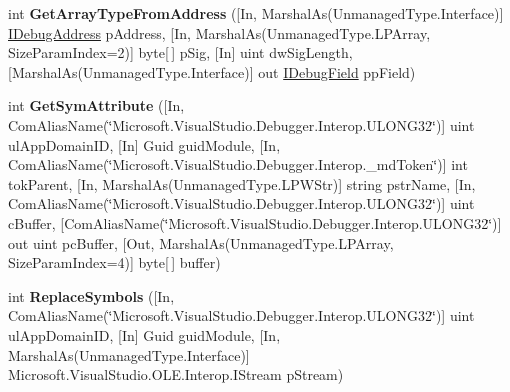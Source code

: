 \begin{DoxyCompactItemize}
\item 
\hypertarget{interface_microsoft_1_1_visual_studio_1_1_debugger_1_1_interop_e_e_1_1_i_debug_com_plus_symbol_provider_aad909dce4c228d835d3479d449cdf4b6}{int {\bfseries Get\+Array\+Type\+From\+Address} (\mbox{[}In, Marshal\+As(Unmanaged\+Type.\+Interface)\mbox{]} \hyperlink{interface_microsoft_1_1_visual_studio_1_1_debugger_1_1_interop_e_e_1_1_i_debug_address}{I\+Debug\+Address} p\+Address, \mbox{[}In, Marshal\+As(Unmanaged\+Type.\+L\+P\+Array, Size\+Param\+Index=2)\mbox{]} byte\mbox{[}$\,$\mbox{]} p\+Sig, \mbox{[}In\mbox{]} uint dw\+Sig\+Length, \mbox{[}Marshal\+As(Unmanaged\+Type.\+Interface)\mbox{]} out \hyperlink{interface_microsoft_1_1_visual_studio_1_1_debugger_1_1_interop_e_e_1_1_i_debug_field}{I\+Debug\+Field} pp\+Field)}\label{interface_microsoft_1_1_visual_studio_1_1_debugger_1_1_interop_e_e_1_1_i_debug_com_plus_symbol_provider_aad909dce4c228d835d3479d449cdf4b6}

\item 
\hypertarget{interface_microsoft_1_1_visual_studio_1_1_debugger_1_1_interop_e_e_1_1_i_debug_com_plus_symbol_provider_a0e70eb2419ce110831336adb5503863b}{int {\bfseries Get\+Sym\+Attribute} (\mbox{[}In, Com\+Alias\+Name(\char`\"{}Microsoft.\+Visual\+Studio.\+Debugger.\+Interop.\+U\+L\+O\+N\+G32\char`\"{})\mbox{]} uint ul\+App\+Domain\+I\+D, \mbox{[}In\mbox{]} Guid guid\+Module, \mbox{[}In, Com\+Alias\+Name(\char`\"{}Microsoft.\+Visual\+Studio.\+Debugger.\+Interop.\+\_\+md\+Token\char`\"{})\mbox{]} int tok\+Parent, \mbox{[}In, Marshal\+As(Unmanaged\+Type.\+L\+P\+W\+Str)\mbox{]} string pstr\+Name, \mbox{[}In, Com\+Alias\+Name(\char`\"{}Microsoft.\+Visual\+Studio.\+Debugger.\+Interop.\+U\+L\+O\+N\+G32\char`\"{})\mbox{]} uint c\+Buffer, \mbox{[}Com\+Alias\+Name(\char`\"{}Microsoft.\+Visual\+Studio.\+Debugger.\+Interop.\+U\+L\+O\+N\+G32\char`\"{})\mbox{]} out uint pc\+Buffer, \mbox{[}Out, Marshal\+As(Unmanaged\+Type.\+L\+P\+Array, Size\+Param\+Index=4)\mbox{]} byte\mbox{[}$\,$\mbox{]} buffer)}\label{interface_microsoft_1_1_visual_studio_1_1_debugger_1_1_interop_e_e_1_1_i_debug_com_plus_symbol_provider_a0e70eb2419ce110831336adb5503863b}

\item 
\hypertarget{interface_microsoft_1_1_visual_studio_1_1_debugger_1_1_interop_e_e_1_1_i_debug_com_plus_symbol_provider_a5db682fcc1ba4f69e1dfca0288addd1c}{int {\bfseries Replace\+Symbols} (\mbox{[}In, Com\+Alias\+Name(\char`\"{}Microsoft.\+Visual\+Studio.\+Debugger.\+Interop.\+U\+L\+O\+N\+G32\char`\"{})\mbox{]} uint ul\+App\+Domain\+I\+D, \mbox{[}In\mbox{]} Guid guid\+Module, \mbox{[}In, Marshal\+As(Unmanaged\+Type.\+Interface)\mbox{]} Microsoft.\+Visual\+Studio.\+O\+L\+E.\+Interop.\+I\+Stream p\+Stream)}\label{interface_microsoft_1_1_visual_studio_1_1_debugger_1_1_interop_e_e_1_1_i_debug_com_plus_symbol_provider_a5db682fcc1ba4f69e1dfca0288addd1c}


\end{DoxyCompactItemize}
